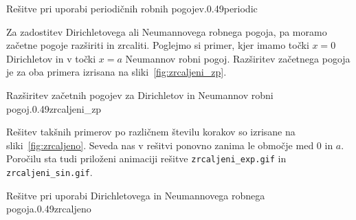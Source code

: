 \documentclass{porocilo}
\begin{document}
\begin{multifig}{2}{Rešitve pri uporabi periodičnih robnih pogojev.}{0.49}{periodic}
\end{multifig}

Za zadostitev Dirichletovega ali Neumannovega robnega pogoja, pa moramo začetne pogoje razširiti in zrcaliti. Poglejmo si primer, kjer imamo točki $x=0$ Dirichletov in v točki $x=a$ Neumannov robni pogoj. Razširitev začetnega pogoja je za oba primera izrisana na sliki~\ref{fig:zrcaljeni_zp}.

\begin{multifig}{2}{Razširitev začetnih pogojev za Dirichletov in Neumannov robni pogoj.}{0.49}{zrcaljeni_zp}
\end{multifig}

Rešitev takšnih primerov po različnem številu korakov so izrisane na sliki~\ref{fig:zrcaljeno}. Seveda nas v rešitvi ponovno zanima le območje med $0$ in $a$. Poročilu sta tudi priloženi animaciji rešitve \texttt{zrcaljeni\_exp.gif} in \texttt{zrcaljeni\_sin.gif}.

\begin{multifig}{2}{Rešitve pri uporabi Dirichletovega in Neumannovega robnega pogoja.}{0.49}{zrcaljeno}
\end{multifig}
\end{document}
